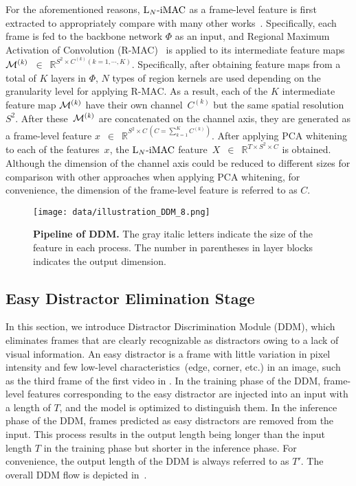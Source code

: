 \documentclass[10pt,twocolumn,letterpaper]{article}
\begin{document}
        For the aforementioned reasons, $\textup{L}_{N}\textup{-iMAC}$ as a frame-level feature is first extracted to appropriately compare with many other works~\cite{kordopatis2017near, kordopatis2019visil, shao2021temporal, ng2022vrag}. Specifically, each frame is fed to the backbone network $\Phi$ as an input, and Regional Maximum Activation of Convolution (R-MAC)~\cite{tolias2016particular} is applied to its intermediate feature maps~$\cal{M}^{\mathit{(k)}}$~$\in$~$\mathbb{R}^{\mathit{S^\mathrm{2} \times C^{\mathit{(k)}} (k=1,\cdots,K)}}$. Specifically, after obtaining feature maps from a total of $K$ layers in $\Phi$, $N$ types of region kernels are used depending on the granularity level for applying R-MAC. As a result, each of the $K$ intermediate feature map $\cal{M}^{\mathit{(k)}}$ have their own channel~${C^{(k)}}$ but the same spatial resolution~$S^2$. After these~$\cal{M}^{\mathit{(k)}}$ are concatenated on the channel axis, they are generated as a frame-level feature $x$~$\in$~$\mathbb{R}^{S^2 \times C \,(C=\sum_{k=1}^{K}C^{(k)})}$. After applying PCA whitening~\cite{jegou2012negative} to each of the features~$x$, the $\textup{L}_{N}\textup{-iMAC}$ feature~$X$~$\in $~$\mathbb{R}^{T \times S^2 \times C}$ is obtained. Although the dimension of the channel axis could be reduced to different sizes for comparison with other approaches when applying PCA whitening, for convenience, the dimension of the frame-level feature is referred to as $C$.
    
    \begin{figure}[t!]     
        \centering
        \texttt{[image: data/illustration\_DDM\_8.png]} 
        \vspace{-3mm}
        \caption{\textbf{Pipeline of DDM.} The gray italic letters indicate the size of the feature in each process. The number in parentheses in layer blocks indicates the output dimension. \vspace{-4mm}} \label{fig:ddm}
    \end{figure}
    
    \subsection{Easy Distractor Elimination Stage}
        In this section, we introduce Distractor Discrimination Module (DDM), which eliminates frames that are clearly recognizable as distractors owing to a lack of visual information. An easy distractor is a frame with little variation in pixel intensity and few low-level characteristics~(edge, corner, etc.) in an image, such as the third frame of the first video in . In the training phase of the DDM, frame-level features corresponding to the easy distractor are injected into an input with a length of $T$, and the model is optimized to distinguish them. In the inference phase of the DDM, frames predicted as easy distractors are removed from the input. This process results in the output length being longer than the input length $T$ in the training phase but shorter in the inference phase. For convenience, the output length of the DDM is always referred to as $T'$. The overall DDM flow is depicted in~.
        \vspace{-3mm}
        
\end{document}
